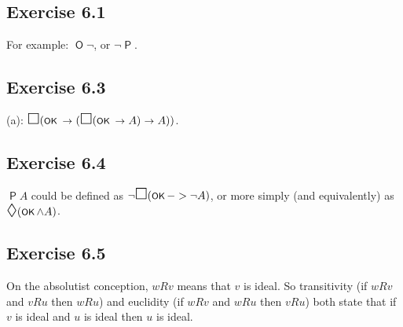 \documentclass{scrartcl}
\let\oldbox\Box
\renewcommand\Box{\scaleobj{1.2}{\oldbox}}
\let\olddiamond\Diamond
\renewcommand\Diamond{\scaleobj{1.2}{\olddiamond}}
\let\oldto\to
\renewcommand\to{\scaleobj{0.95}{\,\oldto\,}}
\DeclareMathOperator{\Ob}{\mathsf{O}}
\DeclareMathOperator{\Pe}{\mathsf{P}}
\newcommand{\smallcaps}[1]{{\text{\footnotesize \MakeUppercase{#1}}}}
\newcommand{\OK}{\mathop{\textsf{\smallcaps{OK}}}}
\begin{document}
  \subsection*{Exercise 6.1}

%
%
  For example: $\Ob \neg$, or $\neg \Pe$.

  \subsection*{Exercise 6.3}
%
%
  (a): $\Box(\OK \to (\Box(\OK \to A) \to A))$.

  \subsection*{Exercise 6.4}

%
%
  $\Pe A$ could be defined as $\neg\Box(\OK->\neg A)$, or more simply (and
  equivalently) as $\Diamond (\OK \land A)$.

  \subsection*{Exercise 6.5}

%
%
  On the absolutist conception, $wRv$ means that $v$ is ideal. So transitivity
  (if $wRv$ and $vRu$ then $wRu$) and euclidity (if $wRv$ and $wRu$ then $vRu$)
  both state that if $v$ is ideal and $u$ is ideal then $u$ is ideal.
\end{document}
